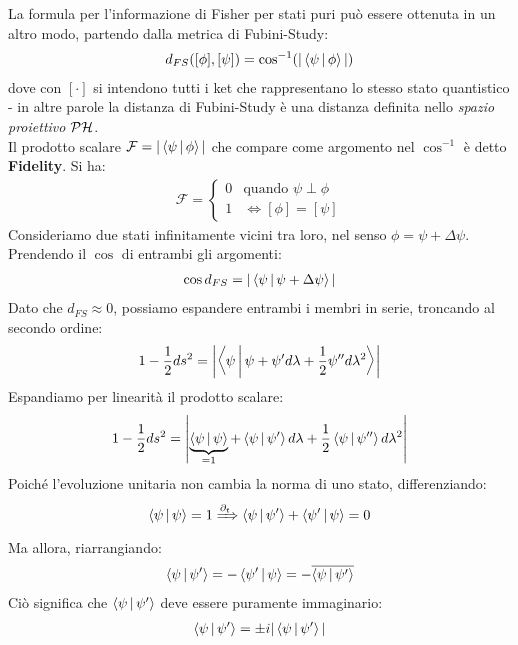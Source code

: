 \documentclass[../../InformazioneQuantistica.tex]{subfiles}
\begin{document}
La formula per l'informazione di Fisher per stati puri può essere ottenuta in un altro modo, partendo dalla metrica di Fubini-Study:
\begin{align*}
d_{FS} ([\phi], [\psi]) = \cos^{-1}(|\Braket{\psi|\phi}|)
\end{align*}
dove con $[\cdot]$ si intendono tutti i ket che rappresentano lo stesso stato quantistico - in altre parole la distanza di Fubini-Study è una distanza definita nello \textit{spazio proiettivo} $\mathcal{P}\mathcal{H}$.\\
Il prodotto scalare $\mathcal{F}=|\Braket{\psi|\phi}|$ che compare come argomento nel $\cos^{-1}$ è detto \textbf{Fidelity}. Si ha:
\begin{align*}
\mathcal{F} = \begin{cases}
0 & \text{quando } \psi \perp \phi\\
1 & \Leftrightarrow [\phi]=[\psi]
\end{cases}
\end{align*}
Consideriamo due stati infinitamente vicini tra loro, nel senso $\phi = \psi + \Delta\psi$. Prendendo il $\cos$ di entrambi gli argomenti:
\begin{align*}
\cos d_{FS} = |\Braket{\psi|\psi+\Delta\psi}|
\end{align*}
Dato che $d_{FS}\approx 0$, possiamo espandere entrambi i membri in serie, troncando al secondo ordine:
\begin{align*}
1-\frac{1}{2} ds^2 = \left|\Braket{\psi|\psi + \psi'd\lambda + \frac{1}{2}\psi'' d\lambda^2}\right|
\end{align*}
Espandiamo per linearità il prodotto scalare:
\begin{align}
1-\frac{1}{2}ds^2 = \left| \underbrace{\Braket{\psi|\psi} }_{=1}+ \Braket{\psi|\psi'}d\lambda + \frac{1}{2} \Braket{\psi|\psi''}d\lambda^2 \right|
\label{eqn:espansione-metrica}
 \end{align}
Poiché l'evoluzione unitaria non cambia la norma di uno stato, differenziando:
\begin{align*}
\Braket{\psi|\psi} = 1 \xRightarrow{\partial_t} \Braket{\psi|\psi'} + \Braket{\psi'|\psi} =0
\end{align*}
Ma allora, riarrangiando:
\begin{align*}
\Braket{\psi|\psi'} = - \Braket{\psi'|\psi} = - \overline{\Braket{\psi|\psi'}}
\end{align*}
Ciò significa che $\Braket{\psi|\psi'}$ deve essere puramente immaginario:
\begin{align*}
\Braket{\psi|\psi'} = \pm i |\Braket{\psi|\psi'}|
\end{align*}
\end{document}
